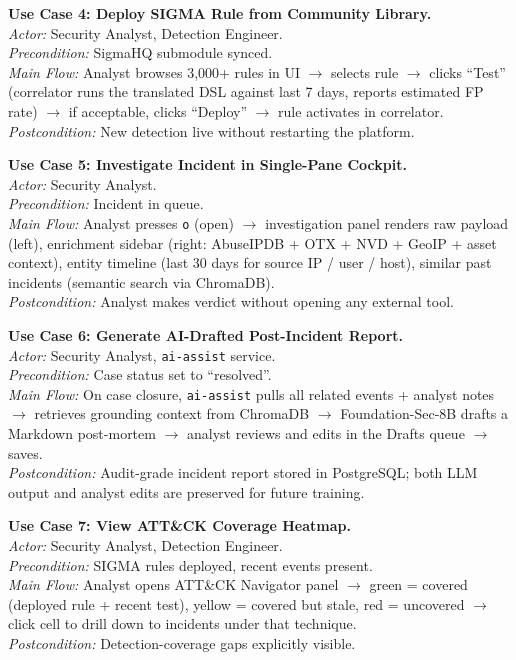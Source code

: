 \documentclass[11pt,a4paper]{article}
\begin{document}
\textbf{Use Case 4: Deploy SIGMA Rule from Community Library.} \\
\textit{Actor:} Security Analyst, Detection Engineer. \\
\textit{Precondition:} SigmaHQ submodule synced. \\
\textit{Main Flow:} Analyst browses 3,000+ rules in UI $\rightarrow$ selects rule $\rightarrow$ clicks ``Test'' (correlator runs the translated DSL against last 7 days, reports estimated FP rate) $\rightarrow$ if acceptable, clicks ``Deploy'' $\rightarrow$ rule activates in correlator. \\
\textit{Postcondition:} New detection live without restarting the platform.

\textbf{Use Case 5: Investigate Incident in Single-Pane Cockpit.} \\
\textit{Actor:} Security Analyst. \\
\textit{Precondition:} Incident in queue. \\
\textit{Main Flow:} Analyst presses \texttt{o} (open) $\rightarrow$ investigation panel renders raw payload (left), enrichment sidebar (right: AbuseIPDB + OTX + NVD + GeoIP + asset context), entity timeline (last 30 days for source IP / user / host), similar past incidents (semantic search via ChromaDB). \\
\textit{Postcondition:} Analyst makes verdict without opening any external tool.

\textbf{Use Case 6: Generate AI-Drafted Post-Incident Report.} \\
\textit{Actor:} Security Analyst, \texttt{ai-assist} service. \\
\textit{Precondition:} Case status set to ``resolved''. \\
\textit{Main Flow:} On case closure, \texttt{ai-assist} pulls all related events + analyst notes $\rightarrow$ retrieves grounding context from ChromaDB $\rightarrow$ Foundation-Sec-8B drafts a Markdown post-mortem $\rightarrow$ analyst reviews and edits in the Drafts queue $\rightarrow$ saves. \\
\textit{Postcondition:} Audit-grade incident report stored in PostgreSQL; both LLM output and analyst edits are preserved for future training.

\textbf{Use Case 7: View ATT\&CK Coverage Heatmap.} \\
\textit{Actor:} Security Analyst, Detection Engineer. \\
\textit{Precondition:} SIGMA rules deployed, recent events present. \\
\textit{Main Flow:} Analyst opens ATT\&CK Navigator panel $\rightarrow$ green = covered (deployed rule + recent test), yellow = covered but stale, red = uncovered $\rightarrow$ click cell to drill down to incidents under that technique. \\
\textit{Postcondition:} Detection-coverage gaps explicitly visible.
\end{document}
